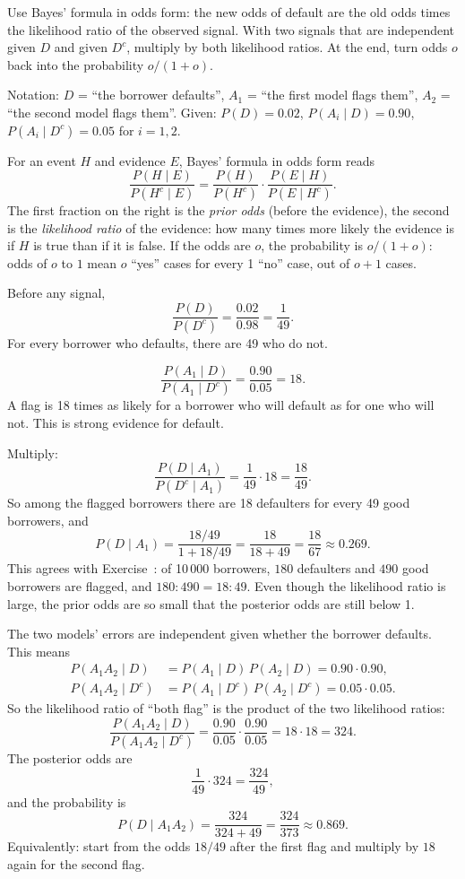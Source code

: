 \begin{solution}
	\idea Use Bayes' formula in odds form: the new odds of default are the old
	odds times the likelihood ratio of the observed signal. With two signals
	that are independent given $D$ and given $D^c$, multiply by both likelihood
	ratios. At the end, turn odds $o$ back into the probability $o/(1+o)$.

	Notation: $D$ = ``the borrower defaults'', $A_1$ = ``the first model flags
	them'', $A_2$ = ``the second model flags them''. Given: $P(D)=0.02$,
	$P(A_i\mid D)=0.90$, $P(A_i\mid D^c)=0.05$ for $i=1,2$.

	 For an event $H$ and evidence $E$, Bayes' formula in odds
	form reads
	\[ \frac{P(H\mid E)}{P(H^c\mid E)}=\frac{P(H)}{P(H^c)}\cdot
		\frac{P(E\mid H)}{P(E\mid H^c)}. \]
	The first fraction on the right is the \emph{prior odds} (before the
	evidence), the second is the \emph{likelihood ratio} of the evidence: how
	many times more likely the evidence is if $H$ is true than if it is false.
	If the odds are $o$, the probability is $o/(1+o)$: odds of $o$ to $1$ mean
	$o$ ``yes'' cases for every 1 ``no'' case, out of $o+1$ cases.

	 Before any signal,
	\[ \frac{P(D)}{P(D^c)}=\frac{0.02}{0.98}=\frac{1}{49}. \]
	For every borrower who defaults, there are 49 who do not.

	\[ \frac{P(A_1\mid D)}{P(A_1\mid D^c)}=\frac{0.90}{0.05}=18. \]
	A flag is 18 times as likely for a borrower who will default as for one who
	will not. This is strong evidence for default.

	 Multiply:
	\[ \frac{P(D\mid A_1)}{P(D^c\mid A_1)}=\frac{1}{49}\cdot18=\frac{18}{49}. \]
	So among the flagged borrowers there are 18 defaulters for every 49 good
	borrowers, and
	\[ P(D\mid A_1)=\frac{18/49}{1+18/49}=\frac{18}{18+49}=\frac{18}{67}
		\approx0.269. \]
	This agrees with Exercise~: of 10\,000 borrowers,
	$180$ defaulters and $490$ good borrowers are flagged, and
	$180:490=18:49$. Even though the likelihood ratio is large, the prior odds
	are so small that the posterior odds are still below 1.

	 The two models' errors are independent given whether
	the borrower defaults. This means
	\[ \begin{aligned}
			P(A_1A_2\mid D)   & =P(A_1\mid D)\,P(A_2\mid D)=0.90\cdot0.90,       \\
			P(A_1A_2\mid D^c) & =P(A_1\mid D^c)\,P(A_2\mid D^c)=0.05\cdot0.05.
		\end{aligned} \]
	So the likelihood ratio of ``both flag'' is the product of the two
	likelihood ratios:
	\[ \frac{P(A_1A_2\mid D)}{P(A_1A_2\mid D^c)}=\frac{0.90}{0.05}\cdot
		\frac{0.90}{0.05}=18\cdot18=324. \]
	The posterior odds are
	\[ \frac{1}{49}\cdot324=\frac{324}{49}, \]
	and the probability is
	\[ P(D\mid A_1A_2)=\frac{324}{324+49}=\frac{324}{373}\approx0.869. \]
	Equivalently: start from the odds $18/49$ after the first flag and multiply
	by $18$ again for the second flag.


\end{solution}
